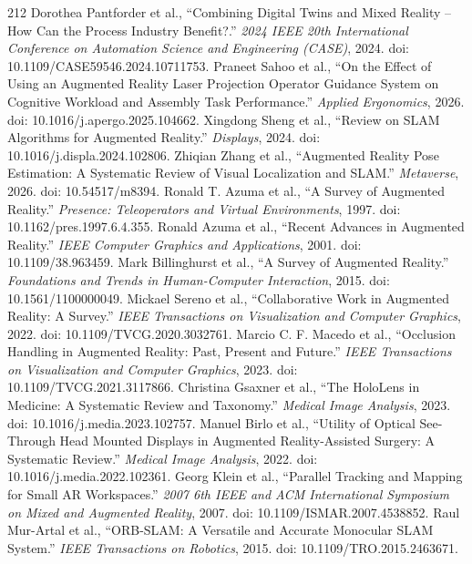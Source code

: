 \begin{thebibliography}{212}
 Dorothea Pantforder et al., ``Combining Digital Twins and Mixed Reality -- How Can the Process Industry Benefit?.'' \emph{2024 IEEE 20th International Conference on Automation Science and Engineering (CASE)}, 2024. doi: 10.1109/CASE59546.2024.10711753.
 Praneet Sahoo et al., ``On the Effect of Using an Augmented Reality Laser Projection Operator Guidance System on Cognitive Workload and Assembly Task Performance.'' \emph{Applied Ergonomics}, 2026. doi: 10.1016/j.apergo.2025.104662.
 Xingdong Sheng et al., ``Review on SLAM Algorithms for Augmented Reality.'' \emph{Displays}, 2024. doi: 10.1016/j.displa.2024.102806.
 Zhiqian Zhang et al., ``Augmented Reality Pose Estimation: A Systematic Review of Visual Localization and SLAM.'' \emph{Metaverse}, 2026. doi: 10.54517/m8394.
 Ronald T. Azuma et al., ``A Survey of Augmented Reality.'' \emph{Presence: Teleoperators and Virtual Environments}, 1997. doi: 10.1162/pres.1997.6.4.355.
 Ronald Azuma et al., ``Recent Advances in Augmented Reality.'' \emph{IEEE Computer Graphics and Applications}, 2001. doi: 10.1109/38.963459.
 Mark Billinghurst et al., ``A Survey of Augmented Reality.'' \emph{Foundations and Trends in Human-Computer Interaction}, 2015. doi: 10.1561/1100000049.
 Mickael Sereno et al., ``Collaborative Work in Augmented Reality: A Survey.'' \emph{IEEE Transactions on Visualization and Computer Graphics}, 2022. doi: 10.1109/TVCG.2020.3032761.
 Marcio C. F. Macedo et al., ``Occlusion Handling in Augmented Reality: Past, Present and Future.'' \emph{IEEE Transactions on Visualization and Computer Graphics}, 2023. doi: 10.1109/TVCG.2021.3117866.
 Christina Gsaxner et al., ``The HoloLens in Medicine: A Systematic Review and Taxonomy.'' \emph{Medical Image Analysis}, 2023. doi: 10.1016/j.media.2023.102757.
 Manuel Birlo et al., ``Utility of Optical See-Through Head Mounted Displays in Augmented Reality-Assisted Surgery: A Systematic Review.'' \emph{Medical Image Analysis}, 2022. doi: 10.1016/j.media.2022.102361.
 Georg Klein et al., ``Parallel Tracking and Mapping for Small {AR} Workspaces.'' \emph{2007 6th IEEE and ACM International Symposium on Mixed and Augmented Reality}, 2007. doi: 10.1109/ISMAR.2007.4538852.
 Raul Mur-Artal et al., ``{ORB-SLAM}: A Versatile and Accurate Monocular {SLAM} System.'' \emph{IEEE Transactions on Robotics}, 2015. doi: 10.1109/TRO.2015.2463671.

\end{thebibliography}
